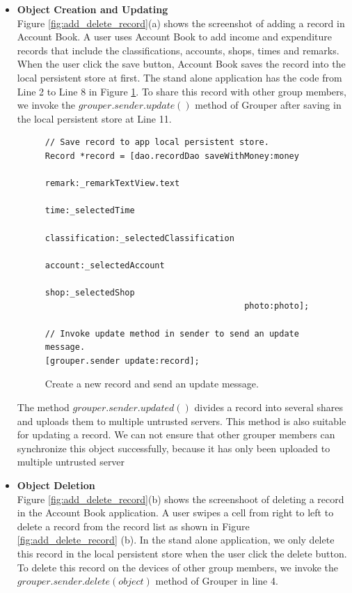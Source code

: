 \documentclass[a4paper,11pt]{report}
\begin{document}
\begin{itemize}
\item \textbf{Object Creation and Updating} \\	
Figure \ref{fig:add_delete_record}(a) shows the screenshot of adding a record in Account Book. 
A user uses Account Book to add income and expenditure records that include the classifications, accounts, shops, times and remarks. 
When the user click the save button, Account Book saves the record into the local persistent store at first.
The stand alone application has the code from Line 2 to Line 8 in Figure \ref{fig:create_record}.
To share this record with other group members, we invoke the $grouper.sender.update()$ method of Grouper after saving in the local persistent store at Line 11.

\begin{figure}
\begin{lstlisting}[frame=none language=Objective-C] 
// Save record to app local persistent store.
Record *record = [dao.recordDao saveWithMoney:money
                                       remark:_remarkTextView.text
                                         time:_selectedTime
                               classification:_selectedClassification
                                      account:_selectedAccount
                                         shop:_selectedShop
                                        photo:photo];

// Invoke update method in sender to send an update message.
[grouper.sender update:record];
\end{lstlisting}
\caption{Create a new record and send an update message.}
\label{fig:create_record}
\end{figure}

The method $grouper.sender.updated()$ divides a record into several shares and uploads them to multiple untrusted servers.
This method is also suitable for updating a record.
We can not ensure that other grouper members can synchronize this object successfully, because it has only been uploaded to multiple untrusted server
\\

\item \textbf{Object Deletion} \\
Figure \ref{fig:add_delete_record}(b) shows the screenshoot of deleting a record in the Account Book application. 
A user swipes a cell from right to left to delete a record from the record list as shown in Figure \ref{fig:add_delete_record} (b).
In the stand alone application, we only delete this record in the local persistent store when the user click the delete button.
To delete this record on the devices of other group members, we invoke the $grouper.sender.delete(object)$ method of Grouper in line 4.


\end{itemize}
\end{document}
